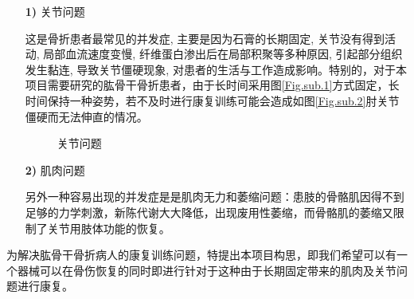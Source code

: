 \documentclass[UTF8]{ctexart}
\begin{document}
        \begin{enumerate}
            \item[\textbf{1)}]关节问题
            
                这是骨折患者最常见的并发症, 主要是因为石膏的长期固定, 关节没有得到活动, 局部血流速度变慢, 纤维蛋白渗出后在局部积聚等多种原因, 引起部分组织发生黏连, 导致关节僵硬现象, 对患者的生活与工作造成影响。特别的，对于本项目需要研究的肱骨干骨折患者，由于长时间采用图\ref{Fig.sub.1}方式固定，长时间保持一种姿势，若不及时进行康复训练可能会造成如图\ref{Fig.sub.2}肘关节僵硬而无法伸直的情况。
                \begin{figure}[H]
                    \centering  %
                    \label{Fig.main}
                    \caption{关节问题}
                \end{figure}
                    
            \item[\textbf{2)}] 肌肉问题
             
                另外一种容易出现的并发症是是肌肉无力和萎缩问题：患肢的骨骼肌因得不到足够的力学刺激，新陈代谢大大降低，出现废用性萎缩，而骨骼肌的萎缩又限制了关节用肢体功能的恢复。\cite{Ref2} 
        \end{enumerate}

        为解决肱骨干骨折病人的康复训练问题，特提出本项目构思，即我们希望可以有一个器械可以在骨伤恢复的同时即进行针对于这种由于长期固定带来的肌肉及关节问题进行康复。
\end{document}
